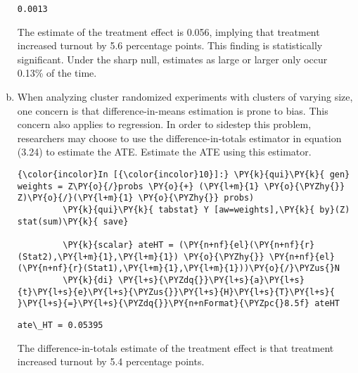\documentclass[11pt,notitlepage]{article}\usepackage[]{graphicx}\usepackage[]{color}
\makeatletter
\newenvironment{kframe}{%
 \def\at@end@of@kframe{}%
 \ifinner\ifhmode%
  \def\at@end@of@kframe{\end{minipage}}%
  \begin{minipage}{\columnwidth}%
 \fi\fi%
 \def\FrameCommand##1{\hskip\@totalleftmargin \hskip-\fboxsep
 \colorbox{shadecolor}{##1}\hskip-\fboxsep
     \hskip-\linewidth \hskip-\@totalleftmargin \hskip\columnwidth}%
 \MakeFramed {\advance\hsize-\width
   \@totalleftmargin\z@ \linewidth\hsize
   \@setminipage}}%
 {\par\unskip\endMakeFramed%
 \at@end@of@kframe}
\newenvironment{knitrout}{}{} %
\makeatother
\begin{document}
\begin{enumerate}[a)]
\begin{knitrout}
\begin{kframe}
    \begin{Verbatim}[commandchars=\\\{\}]
  0.0013
    \end{Verbatim}
\end{kframe}
\end{knitrout}

The estimate of the treatment effect is 0.056, implying that treatment increased turnout by 5.6 percentage points. This finding is statistically significant. Under the sharp null, estimates as large or larger only occur 0.13\% of the time.

\item When analyzing cluster randomized experiments with clusters of varying size, one concern is that difference-in-means estimation is prone to bias. This concern also applies to regression.  In order to sidestep this problem, researchers may choose to use the difference-in-totals estimator in equation (3.24) to estimate the ATE. Estimate the ATE using this estimator.

\begin{knitrout}
\color{fgcolor}\begin{kframe}
\begin{Verbatim}[commandchars=\\\{\}]
{\color{incolor}In [{\color{incolor}10}]:} \PY{k}{qui}\PY{k}{ gen} weights = Z\PY{o}{/}probs \PY{o}{+} (\PY{l+m}{1} \PY{o}{\PYZhy{}} Z)\PY{o}{/}(\PY{l+m}{1} \PY{o}{\PYZhy{}} probs)
         \PY{k}{qui}\PY{k}{ tabstat} Y [aw=weights],\PY{k}{ by}(Z)  stat(sum)\PY{k}{ save}
         
         \PY{k}{scalar} ateHT = (\PY{n+nf}{el}(\PY{n+nf}{r}(Stat2),\PY{l+m}{1},\PY{l+m}{1}) \PY{o}{\PYZhy{}} \PY{n+nf}{el}(\PY{n+nf}{r}(Stat1),\PY{l+m}{1},\PY{l+m}{1}))\PY{o}{/}\PYZus{}N
         \PY{k}{di} \PY{l+s}{\PYZdq{}}\PY{l+s}{a}\PY{l+s}{t}\PY{l+s}{e}\PY{l+s}{\PYZus{}}\PY{l+s}{H}\PY{l+s}{T}\PY{l+s}{ }\PY{l+s}{=}\PY{l+s}{\PYZdq{}}\PY{n+nFormat}{\PYZpc{}8.5f} ateHT
\end{Verbatim}

    \begin{Verbatim}[commandchars=\\\{\}]
ate\_HT = 0.05395

    \end{Verbatim}
\end{kframe}
\end{knitrout}

The difference-in-totals estimate of the treatment effect is that treatment increased turnout by 5.4 percentage points.


\end{enumerate}
\end{document}
